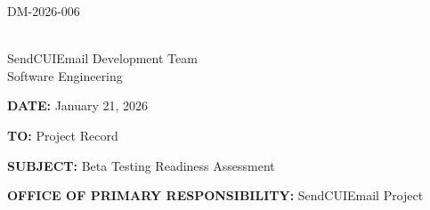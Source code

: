 \documentclass[11pt,letterpaper]{article}
\newcommand{\UniqueID}{DM-2026-006}
\newcommand{\DocumentDate}{January 21, 2026}
\newcommand{\AuthorName}{SendCUIEmail Development Team}
\newcommand{\AuthorTitle}{Software Engineering}
\newcommand{\ToField}{Project Record}
\newcommand{\SubjectField}{Beta Testing Readiness Assessment}
\newcommand{\OPRField}{SendCUIEmail Project}
\begin{document}
\hfill \UniqueID

\vspace{0.25in}

\underline{\hspace{2.5in}}\\[2pt]
\AuthorName\\
\AuthorTitle

\vspace{0.25in}

\textbf{DATE:} \DocumentDate

\textbf{TO:} \ToField

\textbf{SUBJECT:} \SubjectField

\textbf{OFFICE OF PRIMARY RESPONSIBILITY:} \OPRField

\vspace{0.25in}
\end{document}
